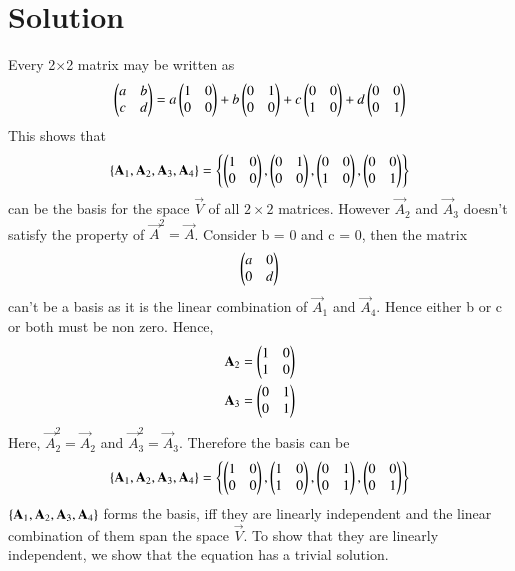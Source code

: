 \documentclass[journal,12pt,twocolumn]{IEEEtran}
\begin{document}
\section{Solution}
Every 2$\times$2 matrix may be written as
\begin{align}
	\begin{pmatrix}a & b\\c & d\end{pmatrix} = a\begin{pmatrix}1 & 0\\0 & 0\end{pmatrix} + b\begin{pmatrix}0 & 1\\0 & 0\end{pmatrix} + c\begin{pmatrix}0& 0\\1 & 0\end{pmatrix} + d\begin{pmatrix}0 & 0\\0 & 1\end{pmatrix}
\end{align}
This shows that 
\begin{align}
	\left\{\mathbf{A}_1, \mathbf{A}_2, \mathbf{A}_3, \mathbf{A}_4\right\} = \left\{\begin{pmatrix}1 & 0\\0 & 0\end{pmatrix}, \begin{pmatrix}0 & 1\\0 & 0\end{pmatrix}, \begin{pmatrix}0& 0\\1 & 0\end{pmatrix}, \begin{pmatrix}0 & 0\\0 & 1\end{pmatrix}\right\}
\end{align}
can be the basis for the space $\vec{V}$ of all $2\times2$ matrices. However $\vec{A}_2$ and $\vec{A}_3$ doesn't satisfy the property of $\vec{A}^2 = \vec{A}$. Consider b = 0 and c = 0, then the matrix 
\begin{align}
	\begin{pmatrix}a & 0\\ 0& d\end{pmatrix} 
\end{align}
can't be a basis as it is the linear combination of $\vec{A}_1$ and $\vec{A}_4$. Hence either b or c or both must be non zero. Hence,
\begin{align}
	\mathbf{A}_2 &= \begin{pmatrix}1 & 0\\1 & 0\end{pmatrix}\\
	\mathbf{A}_3 &=  \begin{pmatrix}0 & 1\\0 & 1\end{pmatrix}
\end{align}
Here, $\vec{A}_2^2 = \vec{A}_2$ and $\vec{A}_3^2 = \vec{A}_3$. Therefore the basis can be
\begin{align}
	\left\{\mathbf{A}_1, \mathbf{A}_2, \mathbf{A}_3, \mathbf{A}_4\right\} = \left\{\begin{pmatrix}1 & 0\\0 & 0\end{pmatrix}, \begin{pmatrix}1 & 0\\1 & 0\end{pmatrix}, \begin{pmatrix}0& 1\\0 & 1\end{pmatrix}, \begin{pmatrix}0 & 0\\0 & 1\end{pmatrix}\right\}
\end{align}
$\left\{\mathbf{A}_1, \mathbf{A}_2, \mathbf{A}_3, \mathbf{A}_4\right\}$ forms the basis, iff they are linearly independent and the linear combination of them span the space $\vec{V}$. To show that they are linearly independent, we show that the equation has a trivial solution.
\end{document}
